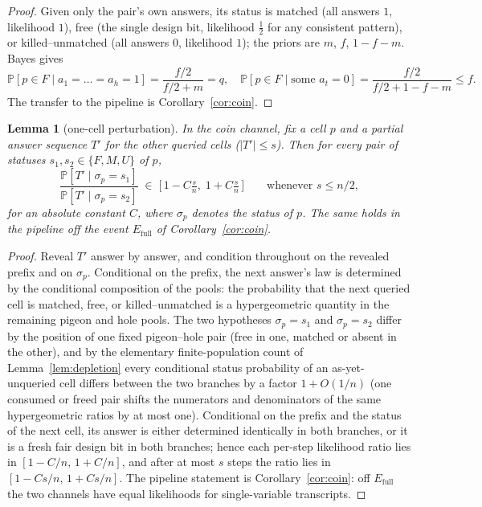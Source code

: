 \documentclass[11pt]{article}
\newtheorem{lemma}[theorem]{Lemma}
\theoremstyle{definition}
\theoremstyle{remark}
\newcommand{\Prob}{\mathbb{P}}
\begin{document}
\begin{proof}
Given only the pair's own answers, its status is matched (all answers
$1$, likelihood $1$), free (the single design bit, likelihood
$\tfrac12$ for any consistent pattern), or killed--unmatched (all
answers $0$, likelihood $1$); the priors are $m$, $f$, $1-f-m$.  Bayes
gives
\[
\Prob[p\in F\mid a_1=\dots=a_h=1]
=\frac{f/2}{f/2+m}=q,
\quad
\Prob[p\in F\mid \text{some } a_t=0]
=\frac{f/2}{f/2+1-f-m}\le f .
\]
The transfer to the pipeline is Corollary~\ref{cor:coin}.
\end{proof}

\begin{lemma}[one-cell perturbation]\label{lem:perturb}
In the coin channel, fix a cell $p$ and a partial answer sequence $T'$
for the other queried cells ($|T'|\le s$).  Then for every pair of
statuses $s_1,s_2\in\{F,M,U\}$ of $p$,
\[
\frac{\Prob[T'\mid \sigma_p=s_1]}{\Prob[T'\mid \sigma_p=s_2]}
\;\in\;\bigl[\,1-C\tfrac{s}{n},\;1+C\tfrac{s}{n}\,\bigr]
\qquad\text{whenever } s\le n/2,
\]
for an absolute constant $C$, where $\sigma_p$ denotes the status of
$p$.  The same holds in the pipeline off the event
$E_{\mathrm{full}}$ of Corollary~\ref{cor:coin}.
\end{lemma}

\begin{proof}
Reveal $T'$ answer by answer, and condition throughout on the revealed
prefix and on $\sigma_p$.  Conditional on the prefix, the next answer's
law is determined by the conditional composition of the pools: the
probability that the next queried cell is matched, free, or
killed--unmatched is a hypergeometric quantity in the remaining pigeon
and hole pools.  The two hypotheses $\sigma_p=s_1$ and $\sigma_p=s_2$
differ by the position of one fixed pigeon--hole pair (free in one,
matched or absent in the other), and by the elementary finite-population
count of Lemma~\ref{lem:depletion} every conditional status probability
of an as-yet-unqueried cell differs between the two branches by a factor
$1+O(1/n)$ (one consumed or freed pair shifts the numerators and
denominators of the same hypergeometric ratios by at most one).
Conditional on the prefix and the status of the next cell, its answer is
either determined identically in both branches, or it is a fresh fair
design bit in both branches; hence each per-step likelihood ratio lies
in $[1-C/n,\,1+C/n]$, and after at most $s$ steps the ratio lies in
$[1-Cs/n,\,1+Cs/n]$.  The pipeline statement is
Corollary~\ref{cor:coin}: off $E_{\mathrm{full}}$ the two channels have
equal likelihoods for single-variable transcripts.
\end{proof}
\end{document}
